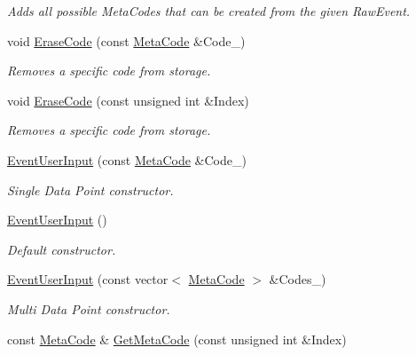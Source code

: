 \begin{DoxyCompactItemize}
\begin{DoxyCompactList}\small\item\em Adds all possible MetaCodes that can be created from the given RawEvent. \item\end{DoxyCompactList}\item 
void \hyperlink{classMezzanine_1_1EventUserInput_aecca59338264fd49cf96661f28f02471}{EraseCode} (const \hyperlink{classMezzanine_1_1MetaCode}{MetaCode} \&Code\_\-)
\begin{DoxyCompactList}\small\item\em Removes a specific code from storage. \item\end{DoxyCompactList}\item 
void \hyperlink{classMezzanine_1_1EventUserInput_aede2a3b45edd2442eeac34814b9c03cc}{EraseCode} (const unsigned int \&Index)
\begin{DoxyCompactList}\small\item\em Removes a specific code from storage. \item\end{DoxyCompactList}\item 
\hyperlink{classMezzanine_1_1EventUserInput_ac54a20c16138388b64a86d8ed13854bb}{EventUserInput} (const \hyperlink{classMezzanine_1_1MetaCode}{MetaCode} \&Code\_\-)
\begin{DoxyCompactList}\small\item\em Single Data Point constructor. \item\end{DoxyCompactList}\item 
\hyperlink{classMezzanine_1_1EventUserInput_a3d5857827ca69112a5acfc715ff29814}{EventUserInput} ()
\begin{DoxyCompactList}\small\item\em Default constructor. \item\end{DoxyCompactList}\item 
\hyperlink{classMezzanine_1_1EventUserInput_aa29e31d1d166c54fd8b87a2dc50cebb6}{EventUserInput} (const vector$<$ \hyperlink{classMezzanine_1_1MetaCode}{MetaCode} $>$ \&Codes\_\-)
\begin{DoxyCompactList}\small\item\em Multi Data Point constructor. \item\end{DoxyCompactList}\item 
const \hyperlink{classMezzanine_1_1MetaCode}{MetaCode} \& \hyperlink{classMezzanine_1_1EventUserInput_aa6f011b62624507078cbbd32a382ba42}{GetMetaCode} (const unsigned int \&Index)

\end{DoxyCompactItemize}
